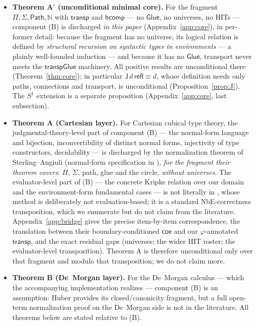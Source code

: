 \documentclass{lmcs}
\newcommand{\transp}{\mathsf{transp}}
\newcommand{\hcomp}{\mathsf{hcomp}}
\newcommand{\refl}{\mathsf{refl}}
\newcommand{\J}{\mathsf{J}}
\newcommand{\Glue}{\mathsf{Glue}}
\renewcommand{\conv}{\equiv}
\newcommand{\Path}{\mathsf{Path}}
\begin{document}
\begin{itemize}
\item \textbf{Theorem A$'$ (unconditional minimal core).}  For the
  fragment $\Pi, \Sigma, \Path, \mathbb{N}$ with $\transp$ and
  $\hcomp$ --- no $\Glue$, no universes, no HITs --- component (B)
  is discharged \emph{in this paper} (Appendix~\ref{app:core}), in
  per-former detail: because the fragment has no universe, its
  logical relation is defined by \emph{structural recursion on
  syntactic types in environments} --- a plainly well-founded
  induction --- and because it has no $\Glue$, transport never meets
  the $\mathsf{transpGlue}$ machinery.  All positive results are
  unconditional there (Theorem~\ref{thm:core}); in particular
  $\J\,d\,\refl \conv d$, whose definition needs only paths,
  connections and transport, is unconditional
  (Proposition~\ref{prop:J}).  The $S^1$ extension is a separate
  proposition (Appendix~\ref{app:core}, last subsection).
\item \textbf{Theorem A (Cartesian layer).}  For Cartesian cubical
  type theory, the judgmental-theory-level part of component (B) ---
  the normal-form language and bijection, inconvertibility of
  distinct normal forms, injectivity of type constructors,
  decidability --- is discharged by the normalization theorem of
  Sterling--Angiuli \cite{SterlingAngiuli} (normal-form specification
  in \cite{HuangNF}), \emph{for the fragment their theorem covers}:
  $\Pi$, $\Sigma$, path, glue and the circle, \emph{without
  universes}.  The evaluator-level part of (B) --- the concrete
  Kripke relation over our domain and the environment-form
  fundamental cases --- is not literally in \cite{SterlingAngiuli},
  whose method is deliberately not evaluation-based; it is a standard
  NbE-correctness transposition, which we enumerate but do not claim
  from the literature.  Appendix~\ref{app:bridge} gives the precise
  item-by-item correspondence, the translation between their
  boundary-conditioned $\mathsf{coe}$ and our $\varphi$-annotated
  $\transp$, and the exact residual gaps (universes; the wider HIT
  roster; the evaluator-level transposition).  Theorem A is therefore
  unconditional only over that fragment and modulo that
  transposition; we do not claim more.
\item \textbf{Theorem B (De~Morgan layer).}  For the De~Morgan
  calculus --- which the accompanying implementation realizes ---
  component (B) is an assumption: Huber \cite{HuberNorm} provides its
  closed/canonicity fragment, but a full open-term normalization
  proof on the De~Morgan side is not in the literature.  All theorems
  below are stated relative to (B).
\end{itemize}
\end{document}
